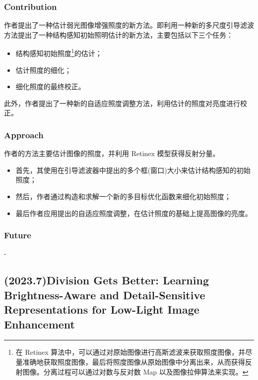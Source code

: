 \documentclass[letterpaper,10pt]{article}
\begin{document}
			\subsubsection{Contribution}
			
			作者提出了一种估计弱光图像增强照度的新方法。即利用一种新的多尺度引导滤波方法提出了一种结构感知初始照明估计的新方法，主要包括以下三个任务：
			
			\begin{itemize}
				\item[(1)] 
				结构感知初始照度\footnote{在 Retinex 算法中，可以通过对原始图像进行高斯滤波来获取照度图像，并尽量准确地获取照度图像，最后将照度图像从原始图像中分离出来，从而获得反射图像。分离过程可以通过对数与反对数 Map 以及图像拉伸算法来实现。}的估计；
				
				\item[(2)]
				估计照度的细化；
				
				\item[(3)]
				细化照度的最终校正。
			\end{itemize}	
			
			此外，作者提出了一种新的自适应照度调整方法，利用估计的照度对亮度进行校正。
			
			\subsubsection{Approach}
			
			作者的方法主要估计图像的照度，并利用 Retinex 模型获得反射分量。
			
			\begin{itemize}
				\item[(1)] 
				首先，其使用在引导滤波器中提出的多个框(窗口)大小来估计结构感知的初始照度；
				
				\item[(2)]
				然后，作者通过构造和求解一个新的多目标优化函数来细化初始照度；
				
				\item[(3)]
				最后作者应用提出的自适应照度调整，在估计照度的基础上提高图像的亮度。
			\end{itemize}	
			
			\subsubsection{Future}
			
			- 
		
		\subsection{(2023.7)Division Gets Better: Learning Brightness-Aware and Detail-Sensitive Representations for Low-Light Image Enhancement}
		
\end{document}
